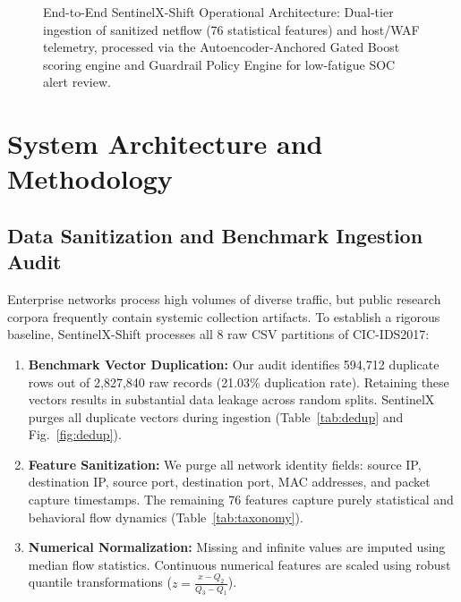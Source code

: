 \documentclass[conference,10pt,twocolumn]{IEEEtran}
\begin{document}
\begin{figure}[!t]
\caption{End-to-End SentinelX-Shift Operational Architecture: Dual-tier ingestion of sanitized netflow (76 statistical features) and host/WAF telemetry, processed via the Autoencoder-Anchored Gated Boost scoring engine and Guardrail Policy Engine for low-fatigue SOC alert review.}
\label{fig:architecture}
\end{figure}

\section{System Architecture and Methodology}

\subsection{Data Sanitization and Benchmark Ingestion Audit}
Enterprise networks process high volumes of diverse traffic, but public research corpora frequently contain systemic collection artifacts. To establish a rigorous baseline, SentinelX-Shift processes all 8 raw CSV partitions of CIC-IDS2017:
\begin{enumerate}
    \item \textbf{Benchmark Vector Duplication:} Our audit identifies 594,712 duplicate rows out of 2,827,840 raw records (21.03\% duplication rate). Retaining these vectors results in substantial data leakage across random splits. SentinelX purges all duplicate vectors during ingestion (Table~\ref{tab:dedup} and Fig.~\ref{fig:dedup}).
    \item \textbf{Feature Sanitization:} We purge all network identity fields: source IP, destination IP, source port, destination port, MAC addresses, and packet capture timestamps. The remaining 76 features capture purely statistical and behavioral flow dynamics (Table~\ref{tab:taxonomy}).
    \item \textbf{Numerical Normalization:} Missing and infinite values are imputed using median flow statistics. Continuous numerical features are scaled using robust quantile transformations ($z = \frac{x - Q_2}{Q_3 - Q_1}$).
\end{enumerate}
\end{document}
